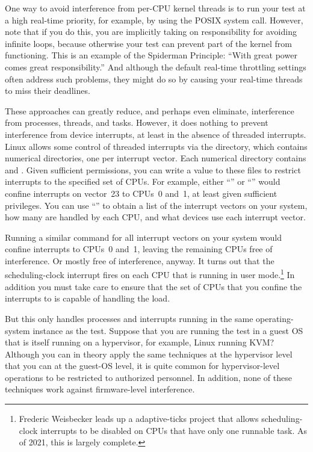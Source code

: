 One way to avoid interference from per-CPU kernel threads is to run
your test at a high real-time priority, for example, by using
the POSIX  system call.
However, note that if you do this, you are implicitly taking on
responsibility for avoiding infinite loops, because otherwise
your test can prevent part of the kernel from functioning.
This is an example of the Spiderman Principle:
``With great power comes great responsibility.''
And although the default real-time throttling settings often address
such problems, they might do so by causing your real-time threads
to miss their deadlines.

These approaches can greatly reduce, and perhaps even eliminate,
interference from processes, threads, and tasks.
However, it does nothing to prevent interference from device
interrupts, at least in the absence of threaded interrupts.
Linux allows some control of threaded interrupts via the
 directory, which contains numerical directories, one
per interrupt vector.
Each numerical directory contains  and
.
Given sufficient permissions, you can write a value to these files
to restrict interrupts to the specified set of CPUs.
For example, either
``''
or
``''
would confine interrupts on vector~23 to CPUs~0 and~1,
at least given sufficient privileges.
You can use ``'' to obtain a list of the interrupt
vectors on your system, how many are handled by each CPU, and what
devices use each interrupt vector.

Running a similar command for all interrupt vectors on your system
would confine interrupts to CPUs~0 and~1, leaving the remaining CPUs
free of interference.
Or mostly free of interference, anyway.
It turns out that the scheduling-clock interrupt fires on each CPU
that is running in user mode.\footnote{
	Frederic Weisbecker leads up a 
	adaptive-ticks project
	that allows scheduling-clock interrupts to be disabled
	on CPUs that have only one runnable task.
	As of 2021, this is largely complete.}
In addition you must take care to ensure that the set of CPUs that you
confine the interrupts to is capable of handling the load.

But this only handles processes and interrupts running in the same
operating-system instance as the test.
Suppose that you are running the test in a guest OS that is itself
running on a hypervisor, for example, Linux running KVM\@?
Although you can in theory apply the same techniques at the hypervisor
level that you can at the guest-OS level, it is quite common for
hypervisor-level operations to be restricted to authorized personnel.
In addition, none of these techniques work against firmware-level
interference.

